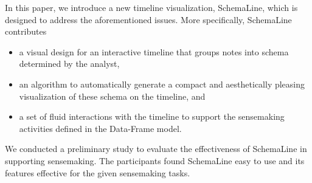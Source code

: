 In this paper, we introduce a new timeline visualization, SchemaLine, which is designed to address the aforementioned issues. More specifically, SchemaLine contributes
\begin{itemize}
	\item a visual design for an interactive timeline that groups notes into schema determined by the analyst,
	\item an algorithm to automatically generate a compact and aesthetically pleasing visualization of these schema on the timeline, and
	\item a set of fluid interactions with the timeline to support the sensemaking activities defined in the Data-Frame model.
\end{itemize}

We conducted a preliminary study to evaluate the effectiveness of SchemaLine in supporting sensemaking. The participants found SchemaLine easy to use and its features effective for the given sensemaking tasks. 

